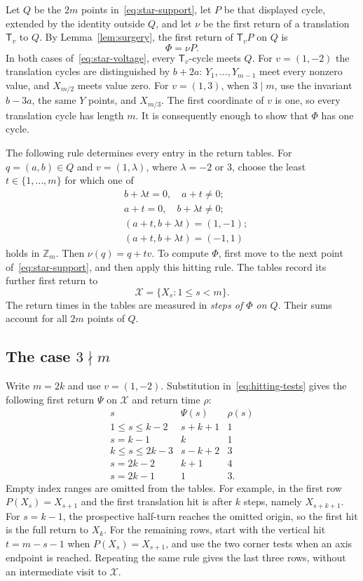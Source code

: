 \documentclass[11pt,reqno]{amsart}
\numberwithin{equation}{section}
\theoremstyle{definition}
\theoremstyle{remark}
\newcommand{\Zm}{\mathbb Z_m}
\newcommand{\tr}{\mathsf T}
\begin{document}
Let $Q$ be the $2m$ points in~\eqref{eq:star-support}, let $P$ be that displayed
cycle, extended by the identity outside $Q$, and let $\nu$ be the first return of
a translation $\tr_v$ to $Q$. By Lemma~\ref{lem:surgery}, the first return of
$\tr_vP$ on $Q$ is
\[
 \Phi=\nu P.
\]
In both cases of~\eqref{eq:star-voltage}, every $\tr_v$-cycle meets $Q$.
For $v=(1,-2)$ the translation cycles are distinguished by $b+2a$:
$Y_1,\ldots,Y_{m-1}$ meet every nonzero value, and $X_{m/2}$ meets value zero.
For $v=(1,3)$, when $3\mid m$, use the invariant $b-3a$, the same $Y$ points,
and $X_{m/3}$. The first coordinate of $v$ is one, so every translation cycle has
length $m$. It is consequently enough to show that $\Phi$ has one cycle.

The following rule determines every entry in the return tables. For $q=(a,b)\in Q$ and $v=(1,\lambda)$, where
$\lambda=-2$ or $3$, choose the least $t\in\{1,\ldots,m\}$ for which one of
\begin{equation}\label{eq:hitting-tests}
\begin{split}
 &b+\lambda t=0,\quad a+t\ne0;\\
 &a+t=0,\quad b+\lambda t\ne0;\\
 &(a+t,b+\lambda t)=(1,-1);\\
 &(a+t,b+\lambda t)=(-1,1)
\end{split}
\end{equation}
holds in $\Zm$. Then $\nu(q)=q+tv$. To compute $\Phi$, first move to the next
point of~\eqref{eq:star-support}, and then apply this hitting rule. The tables
record its further first return to
\[
 \mathcal X=\{X_s:1\le s<m\}.
\]
The return times in the tables are measured in \emph{steps of $\Phi$ on $Q$}.
Their sums account for all $2m$ points of $Q$.

\subsection{The case \texorpdfstring{$3\nmid m$}{3 does not divide m}}
Write $m=2k$ and use $v=(1,-2)$. Substitution in~\eqref{eq:hitting-tests} gives
the following first return $\Psi$ on $\mathcal X$ and return time $\rho$:
\begin{equation}\label{eq:star-table-nondiv}
\begin{array}{c|c|c}
 s&\Psi(s)&\rho(s)\\\hline
 1\le s\le k-2&s+k+1&1\\
 s=k-1&k&1\\
 k\le s\le2k-3&s-k+2&3\\
 s=2k-2&k+1&4\\
 s=2k-1&1&3.
\end{array}
\end{equation}
Empty index ranges are omitted from the tables. For example, in
the first row $P(X_s)=X_{s+1}$ and the first translation hit is after $k$ steps,
namely $X_{s+k+1}$. For $s=k-1$, the prospective half-turn reaches the omitted
origin, so the first hit is the full return to $X_k$. For the remaining rows,
start with the vertical hit $t=m-s-1$ when $P(X_s)=X_{s+1}$, and use the two
corner tests when an axis endpoint is reached. Repeating the same rule gives
the last three rows, without an intermediate visit to $\mathcal X$.
\end{document}
